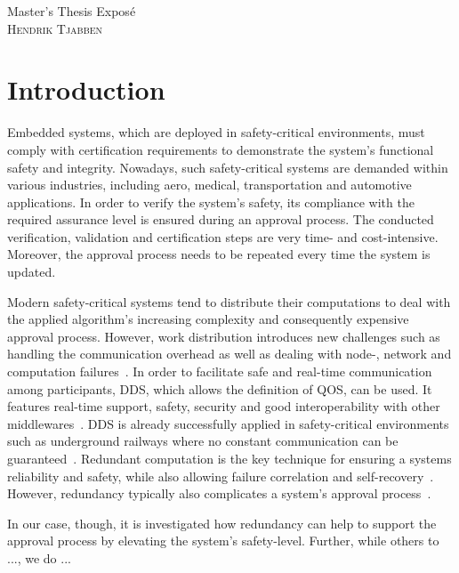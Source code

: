 \documentclass[a4paper, 12pt]{scrartcl}
\begin{document}
\begin{center}
  \Huge{Master's Thesis Expos\'{e}}\\
  \large{\textsc{Hendrik Tjabben}}
\end{center}

\section*{Introduction}
Embedded systems, which are deployed in safety-critical environments, must comply with certification requirements to demonstrate the system's functional safety and integrity.
Nowadays, such safety-critical systems are demanded within various industries, including aero, medical, transportation and automotive applications.
In order to verify the system's safety, its compliance with the required assurance level is ensured during an approval process.
The conducted verification, validation and certification steps are very time- and cost-intensive.
Moreover, the approval process needs to be repeated every time the system is updated.

Modern safety-critical systems tend to distribute their computations to deal with the applied algorithm's increasing complexity and consequently expensive approval process.
However, work distribution introduces new challenges such as handling the communication overhead as well as dealing with node-, network and computation failures~\cite{DistributedSafety2020}.
In order to facilitate safe and real-time communication among participants, \ac{DDS}, which allows the definition of \ac{QOS}, can be used.
It features real-time support, safety, security and good interoperability with other middlewares~\cite{DistributedSafety2020}.
\ac{DDS} is already successfully applied in safety-critical environments such as underground railways where no constant communication can be guaranteed~\cite{DDSInURail}.
Redundant computation is the key technique for ensuring a systems reliability and safety, while also allowing failure correlation and self-recovery~\cite{TanenbaumSteen07}.
However, redundancy typically also complicates a system's approval process~\cite{ReliabilityThroughRedundancy}.

In our case, though, it is investigated how redundancy can help to support the approval process by elevating the system's safety-level.
Further, while others to ..., we do ...
\end{document}

